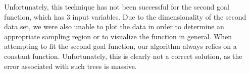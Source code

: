 Unfortunately, this technique has not been successful for the second goal function, which has 3 input variables.  Due to the dimensionality of the second data set, we were also unable to plot the data in order to determine an appropriate sampling region or to visualize the function in general.  When attempting to fit the second goal function, our algorithm always relies on a constant function.  Unfortunately, this is clearly not a correct solution, as the error associated with such trees is massive.







